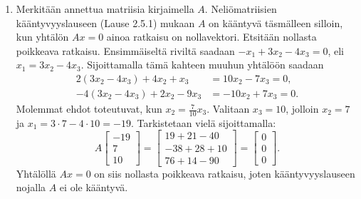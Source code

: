 \documentclass[11pt,a4paper]{amsart}
\begin{document}
\newpage
\begin{solution}
  \leavevmode\par
  \begin{enumerate}[label=(\alph*), leftmargin=*]
    \item Merkitään annettua matriisia kirjaimella \(A\).
      Neliömatriisien kääntyvyyslauseen (Lause 2.5.1)
      mukaan \(A\) on kääntyvä täsmälleen silloin, kun yhtälön
      \(Ax=0\) ainoa ratkaisu on nollavektori. Etsitään nollasta
      poikkeava ratkaisu. Ensimmäiseltä riviltä saadaan
      \(-x_1+3x_2-4x_3=0\), eli \(x_1=3x_2-4x_3\).
      Sijoittamalla tämä kahteen muuhun yhtälöön saadaan
      \[
        \begin{aligned}
          2(3x_2-4x_3)+4x_2+x_3 &= 10x_2-7x_3=0, \\
          -4(3x_2-4x_3)+2x_2-9x_3 &= -10x_2+7x_3=0.
        \end{aligned}
      \]
      Molemmat ehdot toteutuvat, kun \(x_2=\frac7{10}x_3\).
      Valitaan \(x_3=10\), jolloin \(x_2=7\) ja
      \(x_1=3\cdot7-4\cdot10=-19\). Tarkistetaan vielä sijoittamalla:
      \[
        A
        \begin{bmatrix} -19 \\ 7 \\ 10
        \end{bmatrix}
        =
        \begin{bmatrix}
          19+21-40 \\
          -38+28+10 \\
          76+14-90
        \end{bmatrix}
        =
        \begin{bmatrix} 0 \\ 0 \\ 0
        \end{bmatrix}.
      \]
      Yhtälöllä \(Ax=0\) on siis nollasta poikkeava ratkaisu, joten
      kääntyvyyslauseen nojalla \(A\) ei ole kääntyvä.


\end{enumerate}
\end{solution}
\end{document}
